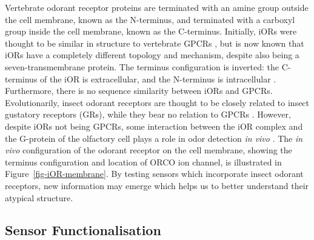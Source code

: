 \documentclass[
  a4paper,
]{scrbook}
\begin{document}
Vertebrate odorant receptor proteins are terminated with an amine group
outside the cell membrane, known as the N-terminus, and terminated with
a carboxyl group inside the cell membrane, known as the C-terminus.
Initially, iORs were thought to be similar in structure to vertebrate
GPCRs \autocite{Clyne1999}, but is now known that iORs have a completely
different topology and mechanism, despite also being a
seven-transmembrane protein. The terminus configuration is inverted: the
C-terminus of the iOR is extracellular, and the N-terminus is
intracellular
\autocite{Smart2008,Glatz2011,Carraher2015,Brito2016,Wicher2021}.
Furthermore, there is no sequence similarity between iORs and GPCRs.
Evolutionarily, insect odorant receptors are thought to be closely
related to insect gustatory receptors (GRs), while they bear no relation
to GPCRs \autocite{Glatz2011,Carraher2015,Wicher2021}. However, despite
iORs not being GPCRs, some interaction between the iOR complex and the
G-protein of the olfactory cell plays a role in odor detection \emph{in
vivo} \autocite{Wicher2008,Wicher2021}. The \emph{in vivo} configuration
of the odorant receptor on the cell membrane, showing the terminus
configuration and location of ORCO ion channel, is illustrated in
Figure~\ref{fig-iOR-membrane}. By testing sensors which incorporate
insect odorant receptors, new information may emerge which helps us to
better understand their atypical structure.

\hypertarget{sensor-functionalisation}{%
\subsection{Sensor Functionalisation}\label{sensor-functionalisation}}
\end{document}
